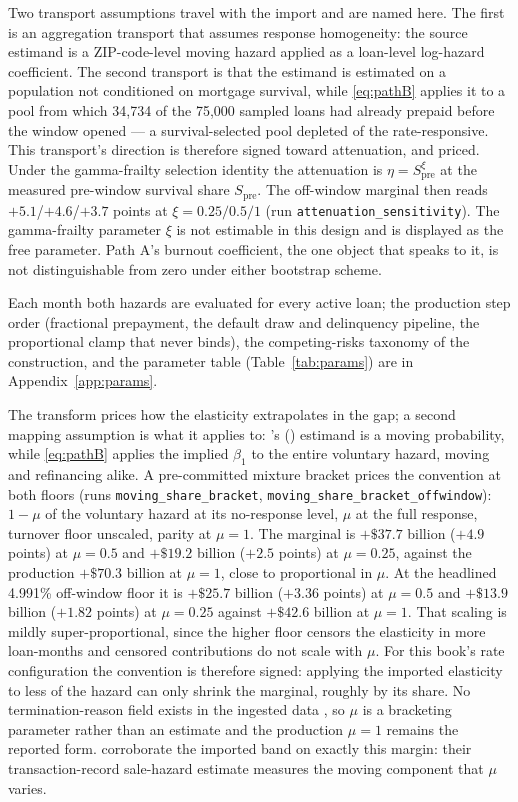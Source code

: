 \documentclass[12pt]{article}
\newcommand{\citepos}[1]{\citeauthor{#1}'s (\citeyear{#1})}
\begin{document}
Two transport assumptions travel with the import and are named here. The first is an aggregation transport that assumes response homogeneity: the source estimand is a ZIP-code-level moving hazard applied as a loan-level log-hazard coefficient. The second transport is that the estimand is estimated on a population not conditioned on mortgage survival, while \eqref{eq:pathB} applies it to a pool from which 34,734 of the 75,000 sampled loans had already prepaid before the window opened --- a survival-selected pool depleted of the rate-responsive. This transport's direction is therefore signed toward attenuation, and priced. Under the gamma-frailty selection identity the attenuation is $\eta = S_{\mathrm{pre}}^{\xi}$ at the measured pre-window survival share $S_{\mathrm{pre}}$. The off-window marginal then reads $+5.1$/$+4.6$/$+3.7$ points at $\xi = 0.25/0.5/1$ (run \texttt{attenuation\_sensitivity}). The gamma-frailty parameter $\xi$ is not estimable in this design and is displayed as the free parameter. Path A's burnout coefficient, the one object that speaks to it, is not distinguishable from zero under either bootstrap scheme.

Each month both hazards are evaluated for every active loan; the production step order (fractional prepayment, the default draw and delinquency pipeline, the proportional clamp that never binds), the competing-risks taxonomy of the construction, and the parameter table (Table~\ref{tab:params}) are in Appendix~\ref{app:params}.

The transform prices how the elasticity extrapolates in the gap; a second mapping assumption is what it applies to: \citepos{liebersohn2024} estimand is a moving probability, while \eqref{eq:pathB} applies the implied $\beta_1$ to the entire voluntary hazard, moving and refinancing alike. A pre-committed mixture bracket prices the convention at both floors (runs \texttt{moving\_share\_bracket}, \texttt{moving\_share\_bracket\_offwindow}): $1-\mu$ of the voluntary hazard at its no-response level, $\mu$ at the full response, turnover floor unscaled, parity at $\mu = 1$. The marginal is $+\$37.7$ billion ($+4.9$ points) at $\mu = 0.5$ and $+\$19.2$ billion ($+2.5$ points) at $\mu = 0.25$, against the production $+\$70.3$ billion at $\mu = 1$, close to proportional in $\mu$. At the headlined 4.991\% off-window floor it is $+\$25.7$ billion ($+3.36$ points) at $\mu = 0.5$ and $+\$13.9$ billion ($+1.82$ points) at $\mu = 0.25$ against $+\$42.6$ billion at $\mu = 1$. That scaling is mildly super-proportional, since the higher floor censors the elasticity in more loan-months and censored contributions do not scale with $\mu$. For this book's rate configuration the convention is therefore signed: applying the imported elasticity to less of the hazard can only shrink the marginal, roughly by its share. No termination-reason field exists in the ingested data \citep[cf.][on the refinancing-versus-moving mix]{amromin2020}, so $\mu$ is a bracketing parameter rather than an estimate and the production $\mu = 1$ remains the reported form. \citet{graybill2026} corroborate the imported band on exactly this margin: their transaction-record sale-hazard estimate measures the moving component that $\mu$ varies.
\end{document}
